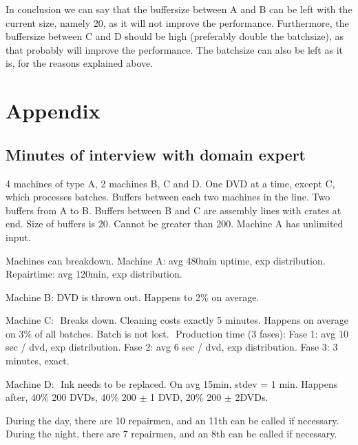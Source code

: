 \documentclass{report}
\begin{document}
In conclusion we can say that the buffersize between A and B can be left with the current size, namely 20, as it will not improve the performance.
Furthermore, the buffersize between C and D should be high (preferably double the batchsize), as that probably will improve the performance.
The batchsize can also be left as it is, for the reasons explained above.

\chapter*{Appendix}

\section*{Minutes of interview with domain expert}

4 machines of type A, 2 machines B, C and D.
One DVD at a time, except C, which processes batches.
Buffers between each two machines in the line.
Two buffers from A to B.
Buffers between B and C are assembly lines with crates at end.
Size of buffers is 20.
Cannot be greater than 200.
Machine A has unlimited input.

Machines can breakdown.
Machine A: avg 480min uptime, exp distribution.
Repairtime: avg 120min, exp distribution.

Machine B:
    DVD is thrown out.
    Happens to 2\% on average.

Machine C:
­ Breaks down.
  Cleaning costs exactly 5 minutes.
  Happens on average on 3\% of all batches.
  Batch is not lost.
  ­ Production time (3 fases):
        Fase 1: avg 10 sec / dvd, exp distribution.
        Fase 2: avg 6 sec / dvd, exp distribution.
        Fase 3: 3 minutes, exact.

Machine D:
­ Ink needs to be replaced.
  On avg 15min, stdev = 1 min.
  Happens after, 40\% 200 DVDs, 40\% 200 $\pm$ 1 DVD, 20\% 200 $\pm$ 2DVDs.

During the day, there are 10 repairmen, and an 11th can be called if necessary.
During the night, there are 7 repairmen, and an 8th can be called if necessary.
\end{document}
